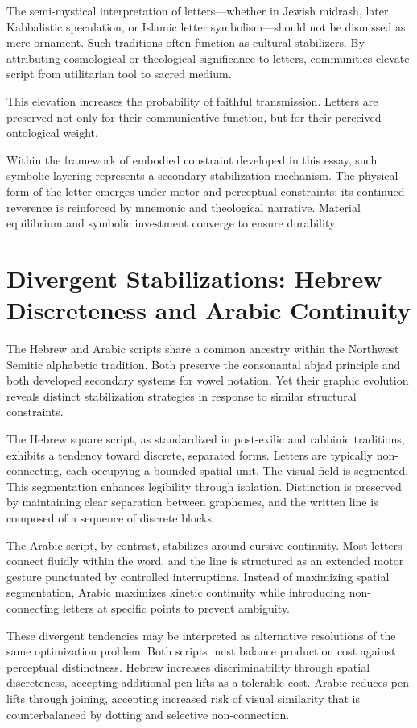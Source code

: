 \documentclass[11pt]{article}
\begin{document}
The semi-mystical interpretation of letters—whether in Jewish midrash, later Kabbalistic speculation, or Islamic letter symbolism—should not be dismissed as mere ornament. Such traditions often function as cultural stabilizers. By attributing cosmological or theological significance to letters, communities elevate script from utilitarian tool to sacred medium.

This elevation increases the probability of faithful transmission. Letters are preserved not only for their communicative function, but for their perceived ontological weight.

Within the framework of embodied constraint developed in this essay, such symbolic layering represents a secondary stabilization mechanism. The physical form of the letter emerges under motor and perceptual constraints; its continued reverence is reinforced by mnemonic and theological narrative. Material equilibrium and symbolic investment converge to ensure durability.

\section{Divergent Stabilizations: Hebrew Discreteness and Arabic Continuity}

The Hebrew and Arabic scripts share a common ancestry within the Northwest Semitic alphabetic tradition. Both preserve the consonantal abjad principle and both developed secondary systems for vowel notation. Yet their graphic evolution reveals distinct stabilization strategies in response to similar structural constraints.

The Hebrew square script, as standardized in post-exilic and rabbinic traditions, exhibits a tendency toward discrete, separated forms. Letters are typically non-connecting, each occupying a bounded spatial unit. The visual field is segmented. This segmentation enhances legibility through isolation. Distinction is preserved by maintaining clear separation between graphemes, and the written line is composed of a sequence of discrete blocks.

The Arabic script, by contrast, stabilizes around cursive continuity. Most letters connect fluidly within the word, and the line is structured as an extended motor gesture punctuated by controlled interruptions. Instead of maximizing spatial segmentation, Arabic maximizes kinetic continuity while introducing non-connecting letters at specific points to prevent ambiguity.

These divergent tendencies may be interpreted as alternative resolutions of the same optimization problem. Both scripts must balance production cost against perceptual distinctness. Hebrew increases discriminability through spatial discreteness, accepting additional pen lifts as a tolerable cost. Arabic reduces pen lifts through joining, accepting increased risk of visual similarity that is counterbalanced by dotting and selective non-connection.
\end{document}
